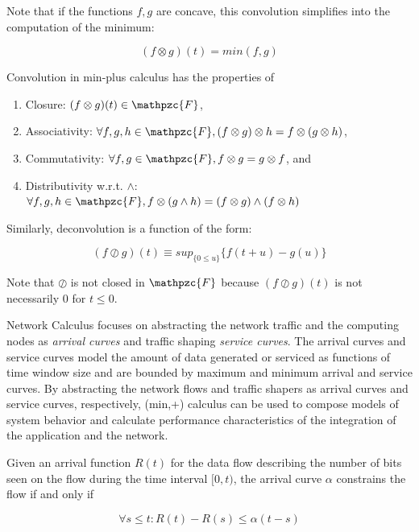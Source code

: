 Note that if the functions $f,g$ are concave, this convolution
simplifies into the computation of the minimum:

\begin{equation}
  (f\otimes g)(t)=min(f,g)
\end{equation}

Convolution in min-plus calculus has the properties of 

\begin{enumerate}
\item Closure: $(f\otimes g)(t) \in \mathpzc{F}$,
\item Associativity: $\forall f,g,h \in \mathpzc{F}, (f\otimes
  g)\otimes h = f\otimes(g\otimes h)$,
\item Commutativity: $\forall f,g \in \mathpzc{F}, f\otimes g
  = g\otimes f$, and
\item Distributivity w.r.t. $\wedge$: $\forall f,g,h \in \mathpzc{F},
  f\otimes(g\wedge h) = (f\otimes g)\wedge(f\otimes h)$
\end{enumerate}

Similarly, deconvolution is a function of the form:

\begin{equation} 
  (f\oslash g)(t)\equiv sup_{\{0\leq u\}}\{f(t+u)-g(u)\}
\end{equation}

Note that $\oslash$ is not closed in $\mathpzc{F}$ because $(f\oslash
g)(t)$ is not necessarily $0$ for $t\leq0$.

Network Calculus focuses on abstracting the network traffic and the
computing nodes as \textit{arrival curves} and traffic shaping
\textit{service curves}. The arrival curves and service curves model
the amount of data generated or serviced as functions of time window
size and are bounded by maximum and minimum arrival and service
curves.  By abstracting the network flows and traffic shapers as
arrival curves and service curves, respectively, (min,+) calculus can
be used to compose models of system behavior and calculate performance
characteristics of the integration of the application and the network.

Given an arrival function $R(t)$ for the data flow describing the
number of bits seen on the flow during the time interval $[0,t)$, the
arrival curve $\alpha$ constrains the flow if and only if

\begin{equation}
  \forall s\leq t : R(t) -R(s) \leq \alpha(t-s)
\end{equation}

